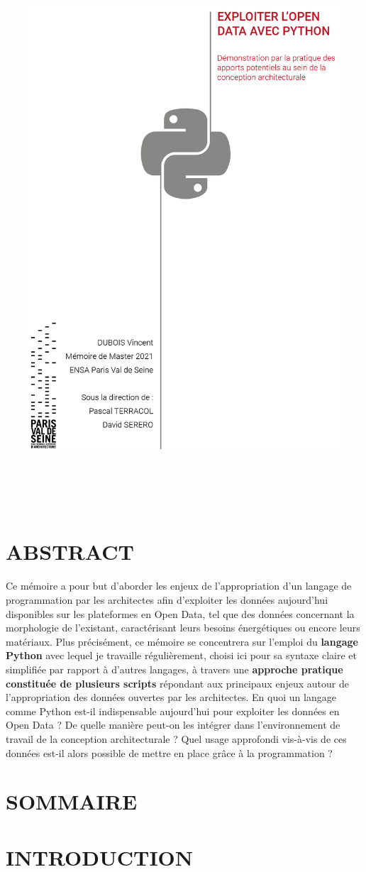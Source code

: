 \documentclass[
  11pt,
  french,
]{article}
\title{\includegraphics[width=0.88\textwidth,height=\textheight]{__imgs/couverture.png}
\thispagestyle{empty} \newpage}
\author{}
\date{\vspace{-2.5em}}
\begin{document}
\maketitle

~

\newpage

\hypertarget{abstract}{%
\section*{ABSTRACT}\label{abstract}}

Ce mémoire a pour but d'aborder les enjeux de l'appropriation d'un
langage de programmation par les architectes afin d'exploiter les
données aujourd'hui disponibles sur les plateformes en Open Data, tel
que des données concernant la morphologie de l'existant, caractérisant
leurs besoins énergétiques ou encore leurs matériaux. Plus précisément,
ce mémoire se concentrera sur l'emploi du \textbf{langage Python} avec
lequel je travaille régulièrement, choisi ici pour sa syntaxe claire et
simplifiée par rapport à d'autres langages, à travers une
\textbf{approche pratique constituée de plusieurs scripts} répondant aux
principaux enjeux autour de l'appropriation des données ouvertes par les
architectes. En quoi un langage comme Python est-il indispensable
aujourd'hui pour exploiter les données en Open Data ? De quelle manière
peut-on les intégrer dans l'environnement de travail de la conception
architecturale ? Quel usage approfondi vis-à-vis de ces données est-il
alors possible de mettre en place grâce à la programmation ?

\newpage

\hypertarget{sommaire}{%
\section*{SOMMAIRE}\label{sommaire}}

\renewcommand{\contentsname}{}
\tableofcontents

\newpage

\hypertarget{introduction}{%
\section*{INTRODUCTION}\label{introduction}}
\end{document}
